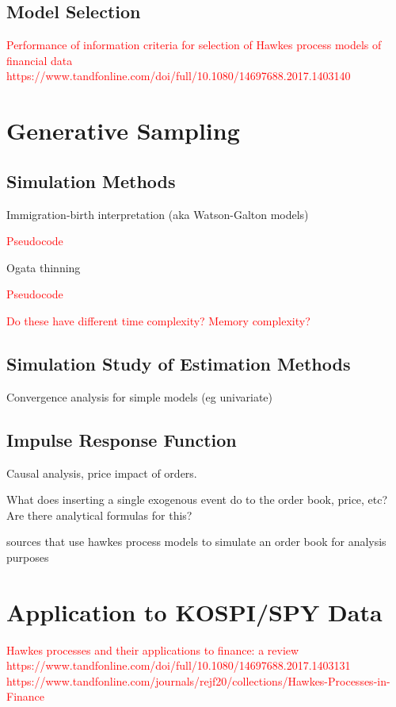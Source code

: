\documentclass[honours,12pt]{unswthesis}
\numberwithin{equation}{section}
\begin{document}
\section{Model Selection}

\textcolor{red}{Performance of information criteria for selection of Hawkes process models of financial data https://www.tandfonline.com/doi/full/10.1080/14697688.2017.1403140}

\chapter{Generative Sampling}
\section{Simulation Methods}
Immigration-birth interpretation \cite{MorariuPatrichiPakkanen}
(aka Watson-Galton models)

\textcolor{red}{Pseudocode}

Ogata thinning 

\textcolor{red}{Pseudocode}

\textcolor{red}{Do these have different time complexity? Memory complexity?}

\section{Simulation Study of Estimation Methods}
Convergence analysis for simple models (eg univariate)

\section{Impulse Response Function}
Causal analysis, price impact of orders.

What does inserting a single exogenous event do to the order book, price, etc? Are there analytical formulas for this?


\cite{AbergelJedidi} \cite{Toke} sources that use hawkes process models to simulate an order book for analysis purposes

\chapter{Application to KOSPI/SPY Data} %

\textcolor{red}{Hawkes processes and their applications to finance: a review https://www.tandfonline.com/doi/full/10.1080/14697688.2017.1403131}
\textcolor{red}{https://www.tandfonline.com/journals/rejf20/collections/Hawkes-Processes-in-Finance}
\end{document}
